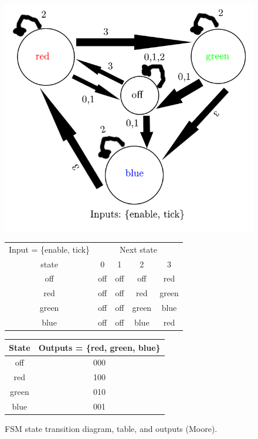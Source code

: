 \documentclass{article}
\begin{document}
\begin{figure}[H]
    \centering
    \includegraphics[width=\textwidth]{Images/fsm}

    \begin{tabular}{|c|cccc|}
        \hline
        Input = \{enable, tick\} & \multicolumn{4}{c|}{Next state} \\ \cline{1-1}
        state & 0 & 1 & 2 & 3 \\ \hline
        off & off & off & off & red \\
        red & off & off & red & green \\
        green & off & off & green & blue \\
        blue & off & off & blue & red \\ \hline
    \end{tabular}

    \begin{tabular}{|c|c|}
        \hline
        State & Outputs = \{red, green, blue\} \\ \hline
        off & 000 \\
        red & 100 \\
        green & 010 \\
        blue & 001\\ \hline
    \end{tabular}
    \caption{FSM state transition diagram, table, and outputs (Moore).}
    \label{fsm}
\end{figure}
\end{document}
